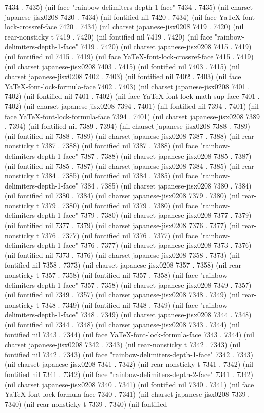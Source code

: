 7434 . 7435) (nil face "rainbow-delimiters-depth-1-face" 7434 . 7435) (nil charset japanese-jisx0208 7420 . 7434) (nil fontified nil 7420 . 7434) (nil face YaTeX-font-lock-crossref-face 7420 . 7434) (nil charset japanese-jisx0208 7419 . 7420) (nil rear-nonsticky t 7419 . 7420) (nil fontified nil 7419 . 7420) (nil face "rainbow-delimiters-depth-1-face" 7419 . 7420) (nil charset japanese-jisx0208 7415 . 7419) (nil fontified nil 7415 . 7419) (nil face YaTeX-font-lock-crossref-face 7415 . 7419) (nil charset japanese-jisx0208 7403 . 7415) (nil fontified nil 7403 . 7415) (nil charset japanese-jisx0208 7402 . 7403) (nil fontified nil 7402 . 7403) (nil face YaTeX-font-lock-formula-face 7402 . 7403) (nil charset japanese-jisx0208 7401 . 7402) (nil fontified nil 7401 . 7402) (nil face YaTeX-font-lock-math-sup-face 7401 . 7402) (nil charset japanese-jisx0208 7394 . 7401) (nil fontified nil 7394 . 7401) (nil face YaTeX-font-lock-formula-face 7394 . 7401) (nil charset japanese-jisx0208 7389 . 7394) (nil fontified nil 7389 . 7394) (nil charset japanese-jisx0208 7388 . 7389) (nil fontified nil 7388 . 7389) (nil charset japanese-jisx0208 7387 . 7388) (nil rear-nonsticky t 7387 . 7388) (nil fontified nil 7387 . 7388) (nil face "rainbow-delimiters-depth-1-face" 7387 . 7388) (nil charset japanese-jisx0208 7385 . 7387) (nil fontified nil 7385 . 7387) (nil charset japanese-jisx0208 7384 . 7385) (nil rear-nonsticky t 7384 . 7385) (nil fontified nil 7384 . 7385) (nil face "rainbow-delimiters-depth-1-face" 7384 . 7385) (nil charset japanese-jisx0208 7380 . 7384) (nil fontified nil 7380 . 7384) (nil charset japanese-jisx0208 7379 . 7380) (nil rear-nonsticky t 7379 . 7380) (nil fontified nil 7379 . 7380) (nil face "rainbow-delimiters-depth-1-face" 7379 . 7380) (nil charset japanese-jisx0208 7377 . 7379) (nil fontified nil 7377 . 7379) (nil charset japanese-jisx0208 7376 . 7377) (nil rear-nonsticky t 7376 . 7377) (nil fontified nil 7376 . 7377) (nil face "rainbow-delimiters-depth-1-face" 7376 . 7377) (nil charset japanese-jisx0208 7373 . 7376) (nil fontified nil 7373 . 7376) (nil charset japanese-jisx0208 7358 . 7373) (nil fontified nil 7358 . 7373) (nil charset japanese-jisx0208 7357 . 7358) (nil rear-nonsticky t 7357 . 7358) (nil fontified nil 7357 . 7358) (nil face "rainbow-delimiters-depth-1-face" 7357 . 7358) (nil charset japanese-jisx0208 7349 . 7357) (nil fontified nil 7349 . 7357) (nil charset japanese-jisx0208 7348 . 7349) (nil rear-nonsticky t 7348 . 7349) (nil fontified nil 7348 . 7349) (nil face "rainbow-delimiters-depth-1-face" 7348 . 7349) (nil charset japanese-jisx0208 7344 . 7348) (nil fontified nil 7344 . 7348) (nil charset japanese-jisx0208 7343 . 7344) (nil fontified nil 7343 . 7344) (nil face YaTeX-font-lock-formula-face 7343 . 7344) (nil charset japanese-jisx0208 7342 . 7343) (nil rear-nonsticky t 7342 . 7343) (nil fontified nil 7342 . 7343) (nil face "rainbow-delimiters-depth-1-face" 7342 . 7343) (nil charset japanese-jisx0208 7341 . 7342) (nil rear-nonsticky t 7341 . 7342) (nil fontified nil 7341 . 7342) (nil face "rainbow-delimiters-depth-2-face" 7341 . 7342) (nil charset japanese-jisx0208 7340 . 7341) (nil fontified nil 7340 . 7341) (nil face YaTeX-font-lock-formula-face 7340 . 7341) (nil charset japanese-jisx0208 7339 . 7340) (nil rear-nonsticky t 7339 . 7340) (nil fontified 